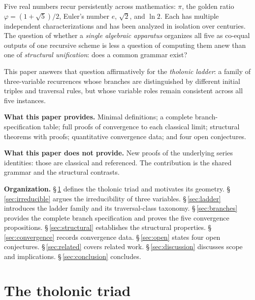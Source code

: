 \documentclass[12pt]{article}
\theoremstyle{definition}
\theoremstyle{remark}
\begin{document}
Five real numbers recur persistently across mathematics: $\pi$, the golden ratio
$\varphi = (1+\sqrt{5})/2$, Euler's number $e$, $\sqrt{2}$, and $\ln 2$. Each has
multiple independent characterizations and has been analyzed in isolation over centuries.
The question of whether a \emph{single algebraic apparatus} organizes all five as
co-equal outputs of one recursive scheme is less a question of computing them anew than
one of \emph{structural unification}: does a common grammar exist?

This paper answers that question affirmatively for the \emph{tholonic ladder}: a family
of three-variable recurrences whose branches are distinguished by different initial
triples and traversal rules, but whose variable roles remain consistent across all five instances.

\textbf{What this paper provides.} Minimal definitions; a complete branch-specification
table; full proofs of convergence to each classical limit; structural theorems with proofs;
quantitative convergence data; and four open conjectures.

\textbf{What this paper does not provide.} New proofs of the underlying series
identities: those are classical and referenced. The contribution is the shared grammar
and the structural contrasts.

\textbf{Organization.}
\S\,\ref{sec:triad} defines the tholonic triad and motivates its geometry.
\S\,\ref{sec:irreducible} argues the irreducibility of three variables.
\S\,\ref{sec:ladder} introduces the ladder family and its traversal-class taxonomy.
\S\,\ref{sec:branches} provides the complete branch specification and proves the five
convergence propositions.
\S\,\ref{sec:structural} establishes the structural properties.
\S\,\ref{sec:convergence} records convergence data.
\S\,\ref{sec:open} states four open conjectures.
\S\,\ref{sec:related} covers related work.
\S\,\ref{sec:discussion} discusses scope and implications.
\S\,\ref{sec:conclusion} concludes.

\section{The tholonic triad}\label{sec:triad}
\end{document}
